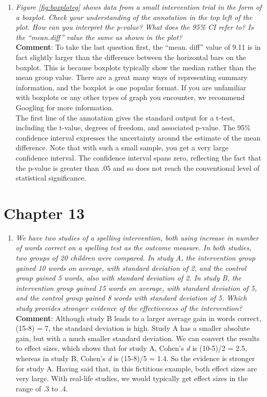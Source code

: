 \documentclass{krantz}
\providecommand{\tightlist}{%
\setlength{\itemsep}{0pt}\setlength{\parskip}{0pt}}
\begin{document}
\begin{enumerate}
\def\labelenumi{\arabic{enumi}.}
\tightlist
\item
  \emph{Figure \ref{fig:boxploteg} shows data from a small intervention trial in the form of a boxplot. Check your understanding of the annotation in the top left of the plot. How can you interpret the p-value? What does the 95\% CI refer to? Is the ``mean.diff'' value the same as shown in the plot?}\\
  \textbf{Comment}: To take the last question first, the ``mean. diff'' value of 9.11 is in fact slightly larger than the difference between the horizontal bars on the boxplot. This is because boxplots typically show the median rather than the mean group value. There are a great many ways of representing summary information, and the boxplot is one popular format. If you are unfamiliar with boxplots or any other types of graph you encounter, we recommend Googling for more information.\\
  The first line of the annotation gives the standard output for a t-test, including the t-value, degrees of freedom, and associated p-value. The 95\% confidence interval expresses the uncertainty around the estimate of the mean difference. Note that with such a small sample, you get a very large confidence interval. The confidence interval spans zero, reflecting the fact that the p-value is greater than .05 and so does not reach the conventional level of statistical significance.
\end{enumerate}

\hypertarget{chapter-13}{%
\section{Chapter 13}\label{chapter-13}}

\begin{enumerate}
\def\labelenumi{\arabic{enumi}.}
\tightlist
\item
  \emph{We have two studies of a spelling intervention, both using increase in number of words correct on a spelling test as the outcome measure. In both studies, two groups of 20 children were compared. In study A, the intervention group gained 10 words on average, with standard deviation of 2, and the control group gained 5 words, also with standard deviation of 2. In study B, the intervention group gained 15 words on average, with standard deviation of 5, and the control group gained 8 words with standard deviation of 5. Which study provides stronger evidence of the effectiveness of the intervention?}\\
  \textbf{Comment}: Although study B leads to a larger average gain in words correct, (15-8) = 7, the standard deviation is high. Study A has a smaller absolute gain, but with a much smaller standard deviation. We can convert the results to effect sizes, which shows that for study A, Cohen's \emph{d} is (10-5)/2 = 2.5, whereas in study B, Cohen's \emph{d} is (15-8)/5 = 1.4. So the evidence is stronger for study A. Having said that, in this fictitious example, both effect sizes are very large. With real-life studies, we would typically get effect sizes in the range of .3 to .4.
\end{enumerate}
\end{document}
